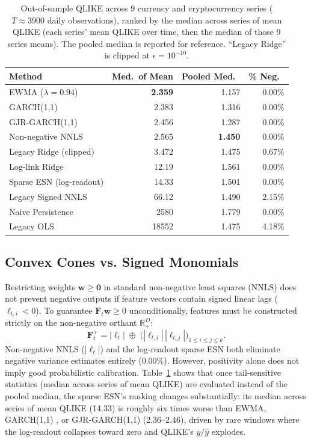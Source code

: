 \documentclass[aip,cha,reprint,amsmath,amssymb]{revtex4-2}
\begin{document}
\begin{table}[h]
\centering
\caption{Out-of-sample QLIKE across 9 currency and cryptocurrency series ($T \approx 3900$ daily observations), ranked by the median across series of mean QLIKE (each series' mean QLIKE over time, then the median of those 9 series means). The pooled median is reported for reference. ``Legacy Ridge'' is clipped at $\epsilon = 10^{-10}$.}
\label{tab:fx_qlike}
\begin{ruledtabular}
\scriptsize
\setlength{\tabcolsep}{2pt}
\begin{tabular}{lrrr}
Method & Med.\ of Mean & Pooled Med.\ & \% Neg.\ \\
\midrule
EWMA ($\lambda=0.94$) & \textbf{2.359} & 1.157 & 0.00\% \\
GARCH(1,1) & 2.383 & 1.316 & 0.00\% \\
GJR-GARCH(1,1) & 2.456 & 1.287 & 0.00\% \\
Non-negative NNLS & 2.565 & \textbf{1.450} & 0.00\% \\
Legacy Ridge (clipped) & 3.472 & 1.475 & 0.67\% \\
Log-link Ridge & 12.19 & 1.561 & 0.00\% \\
Sparse ESN (log-readout) & 14.33 & 1.501 & 0.00\% \\
Legacy Signed NNLS & 66.12 & 1.490 & 2.15\% \\
Naive Persistence & 2580 & 1.779 & 0.00\% \\
Legacy OLS & 18552 & 1.475 & 4.18\% \\
\end{tabular}
\end{ruledtabular}
\end{table}

\subsection{Convex Cones vs. Signed Monomials}

Restricting weights $\mathbf{w} \ge \mathbf{0}$ in standard non-negative least squares (NNLS) \cite{lawson1974solving} does not prevent negative outputs if feature vectors contain signed linear lags ($\ell_{t,i} < 0$). To guarantee $\mathbf{F}_t \mathbf{w} \ge 0$ unconditionally, features must be constructed strictly on the non-negative orthant $\mathbb{R}_+^D$:
\begin{equation}
\mathbf{F}_t^+ = |\bm{\ell}_t| \;\oplus\; \Big( |\ell_{t,i}|\,|\ell_{t,j}| \Big)_{1 \le i \le j \le k}.
\end{equation}
Non-negative NNLS ($|\bm{\ell}_t|$) and the log-readout sparse ESN both eliminate negative variance estimates entirely (0.00\%). However, positivity alone does not imply good probabilistic calibration. Table~\ref{tab:fx_qlike} shows that once tail-sensitive statistics (median across series of mean QLIKE) are evaluated instead of the pooled median, the sparse ESN's ranking changes substantially: its median across series of mean QLIKE (14.33) is roughly six times worse than EWMA, GARCH(1,1) \cite{engle1982autoregressive,bollerslev1986generalized}, or GJR-GARCH(1,1) \cite{glosten1993relation} (2.36--2.46), driven by rare windows where the log-readout collapses toward zero and QLIKE's $y/\hat{y}$ explodes.
\end{document}
